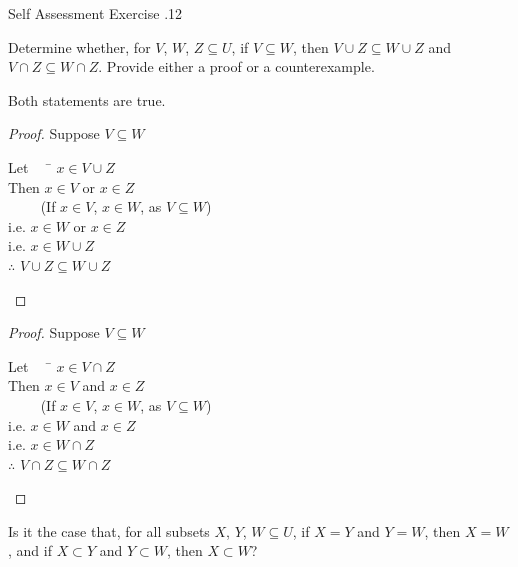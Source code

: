 \documentclass[\main/notes.tex]{subfiles}
\begin{document}
			\pagebreak
			\begin{exercise}{Self Assessment Exercise \thechapter.12}
				\begin{questions}
					\item Determine whether, for $V$, $W$, $Z \subseteq U$, if $V \subseteq W$, then $V \cup Z \subseteq W \cup Z$ and $V \cap Z \subseteq W \cap Z$. Provide either a proof or a counterexample.\\
						\begin{answer}
							Both statements are true.
							\begin{indentparagraph}
								\begin{proof}
									Suppose $V \subseteq W$
									\begin{tabbing}
										Let $\quad$ \= $x \in V \cup Z$\\
										Then \> $x \in V$ or $x \in Z$\\
										\> $\qquad$ (If $x \in V$, $x \in W$, as $V \subseteq W$)\\
										i.e. \> $x \in W$ or $x \in Z$\\
										i.e. \> $x \in W \cup Z$\\
										$\therefore$ \> $V \cup Z \subseteq W \cup Z$
									\end{tabbing}
								\end{proof}
								\begin{proof}
									Suppose $V \subseteq W$ 
									\begin{tabbing}
										Let $\quad$ \= $x \in V \cap Z$\\
										Then \> $x \in V$ and $x \in Z$\\
										\> $\qquad$ (If $x \in V$, $x \in W$, as $V \subseteq W$)\\
										i.e. \> $x \in W$ and $x \in Z$\\
										i.e. \> $x \in W \cap Z$\\
										$\therefore$ \> $V \cap Z \subseteq W \cap Z$
									\end{tabbing}
								\end{proof}
							\end{indentparagraph}
						\end{answer}
					\item Is it the case that, for all subsets $X$, $Y$, $W \subseteq U$, if $X = Y$ and $Y = W$, then $X = W$, and if $X \subset Y$ and $Y \subset W$, then $X \subset W$?\\
						\begin{answer}

\end{answer}
\end{questions}
\end{exercise}
\end{document}

